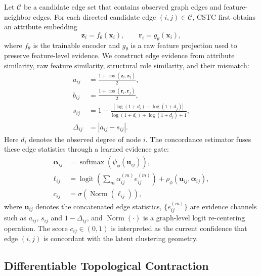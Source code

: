 Let $\mathcal{C}$ be a candidate edge set that contains observed graph edges and feature-neighbor edges. For each directed candidate edge $(i,j)\in\mathcal{C}$, CSTC first obtains an attribute embedding
\begin{equation}
  \mathbf{z}_i = f_{\theta}(\mathbf{x}_i), \qquad
  \mathbf{r}_i = g_{\theta}(\mathbf{x}_i),
\end{equation}
where $f_{\theta}$ is the trainable encoder and $g_{\theta}$ is a raw feature projection used to preserve feature-level evidence. We construct edge evidence from attribute similarity, raw feature similarity, structural role similarity, and their mismatch:
\begin{align}
  a_{ij} &= \frac{1+\cos(\mathbf{z}_i,\mathbf{z}_j)}{2}, \\
  b_{ij} &= \frac{1+\cos(\mathbf{r}_i,\mathbf{r}_j)}{2}, \\
  s_{ij} &= 1-\frac{|\log(1+d_i)-\log(1+d_j)|}
  {\log(1+d_i)+\log(1+d_j)+1}, \\
  \Delta_{ij} &= |a_{ij}-s_{ij}|.
\end{align}
Here $d_i$ denotes the observed degree of node $i$. The concordance estimator fuses these edge statistics through a learned evidence gate:
\begin{align}
  \boldsymbol{\alpha}_{ij}
  &= \operatorname{softmax}(\psi_{\phi}(\mathbf{u}_{ij})), \\
  \ell_{ij}
  &= \operatorname{logit}\!\left(
      \sum_{m}\alpha_{ij}^{(m)} e_{ij}^{(m)}
     \right)
     + \rho_{\phi}(\mathbf{u}_{ij},\boldsymbol{\alpha}_{ij}), \\
  c_{ij} &= \sigma(\operatorname{Norm}(\ell_{ij})),
\end{align}
where $\mathbf{u}_{ij}$ denotes the concatenated edge statistics, $\{e_{ij}^{(m)}\}$ are evidence channels such as $a_{ij}$, $s_{ij}$ and $1-\Delta_{ij}$, and $\operatorname{Norm}(\cdot)$ is a graph-level logit re-centering operation. The score $c_{ij}\in(0,1)$ is interpreted as the current confidence that edge $(i,j)$ is concordant with the latent clustering geometry.

\subsection{Differentiable Topological Contraction}
\label{subsec:dtc}

